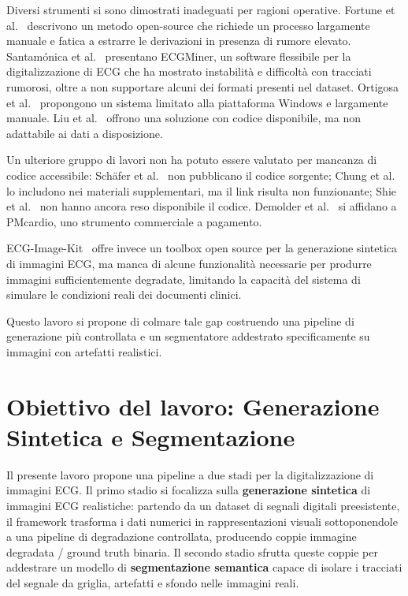 Diversi strumenti si sono dimostrati inadeguati per ragioni operative. Fortune et al.~\cite{fortune2022} descrivono un metodo open-source che richiede un processo largamente manuale e fatica a estrarre le derivazioni in presenza di rumore elevato. Santam\'{o}nica et al.~\cite{santamonica2024} presentano ECGMiner, un software flessibile per la digitalizzazione di ECG che ha mostrato instabilità e difficoltà con tracciati rumorosi, oltre a non supportare alcuni dei formati presenti nel dataset. Ortigosa et al.~\cite{ortigosa2014} propongono un sistema limitato alla piattaforma Windows e largamente  manuale. Liu et al.~\cite{liu2026} offrono una soluzione con codice disponibile, ma non adattabile ai dati a disposizione.

Un ulteriore gruppo di lavori non ha potuto essere valutato per mancanza di codice accessibile: Schäfer et al.~\cite{schafer2023} non pubblicano il codice sorgente; Chung et al.~\cite{chung2018} lo includono nei materiali supplementari, ma il link risulta non funzionante; Shie et al.~\cite{shie2025} non hanno ancora reso disponibile il codice. Demolder et al.~\cite{demolder2025} si affidano a PMcardio, uno strumento commerciale a pagamento.

ECG-Image-Kit~\cite{ecgimagekitpaper} offre invece un toolbox open source per la generazione sintetica di immagini ECG, ma manca di alcune funzionalità necessarie per produrre immagini sufficientemente degradate, limitando la capacità del sistema di simulare le condizioni reali dei documenti clinici.

Questo lavoro si propone di colmare tale gap costruendo una pipeline di generazione più controllata e un segmentatore addestrato specificamente su immagini con artefatti realistici.

\section{Obiettivo del lavoro: Generazione Sintetica e Segmentazione}
Il presente lavoro propone una pipeline a due stadi per la digitalizzazione di immagini ECG. Il primo stadio si focalizza sulla \textbf{generazione sintetica} di immagini ECG realistiche: partendo da un dataset di segnali digitali preesistente, il framework trasforma i dati numerici in rappresentazioni visuali sottoponendole a una pipeline di degradazione controllata, producendo coppie immagine degradata / ground truth binaria. Il secondo stadio sfrutta queste coppie per addestrare un modello di \textbf{segmentazione semantica} capace di isolare i tracciati del segnale da griglia, artefatti e sfondo nelle immagini reali.

